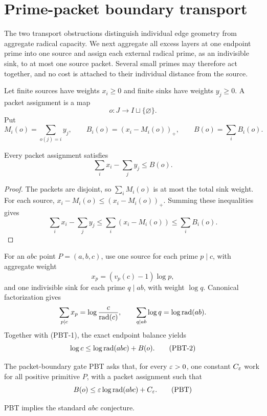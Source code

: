\section{Prime-packet boundary transport}
\label{sec:prime-packet-boundary-transport}

The two transport obstructions distinguish individual edge geometry from
aggregate radical capacity.  We next aggregate all excess layers at one
endpoint prime into one source and assign each external radical prime, as an
indivisible sink, to at most one source packet.  Several small primes may
therefore act together, and no cost is attached to their individual distance
from the source.

Let finite sources have weights $x_i\ge0$ and finite sinks have weights
$y_j\ge0$.  A packet assignment is a map
\[
 o:J\longrightarrow I\sqcup\{\varnothing\}.
\]
Put
\[
 M_i(o)=\sum_{o(j)=i}y_j,\qquad
 B_i(o)=(x_i-M_i(o))_+,\qquad
 B(o)=\sum_iB_i(o).
\]

\begin{proposition}
\label{prop:packet-boundary-inequality}
Every packet assignment satisfies
\[
 \sum_i x_i-\sum_jy_j\le B(o).
\tag{PBT-1}
\]
\end{proposition}

\begin{proof}
The packets are disjoint, so
$\sum_iM_i(o)$ is at most the total sink weight.  For each source,
$x_i-M_i(o)\le(x_i-M_i(o))_+$.  Summing these inequalities gives
\[
 \sum_i x_i-\sum_jy_j
 \le\sum_i(x_i-M_i(o))
 \le\sum_iB_i(o).
\]
\end{proof}

For an $abc$ point $P=(a,b,c)$, use one source for each prime $p\mid c$,
with aggregate weight
\[
 x_p=(v_p(c)-1)\log p,
\]
and one indivisible sink for each prime $q\mid ab$, with weight $\log q$.
Canonical factorization gives
\[
 \sum_{p\mid c}x_p=\log\frac{c}{\operatorname{rad}(c)},\qquad
 \sum_{q\mid ab}\log q=\log\operatorname{rad}(ab).
\]
Together with (PBT-1), the exact endpoint balance yields
\[
 \log c\le\log\operatorname{rad}(abc)+B(o).
\tag{PBT-2}
\]

The packet-boundary gate PBT asks that, for every $\varepsilon>0$, one constant
$C_\varepsilon$ work for all positive primitive $P$, with a packet assignment such
that
\[
 B(o)\le\varepsilon\log\operatorname{rad}(abc)+C_\varepsilon.
\tag{PBT}
\]

\begin{theorem}
\label{thm:packet-boundary-implies-abc}
PBT implies the standard $abc$ conjecture.
\end{theorem}

